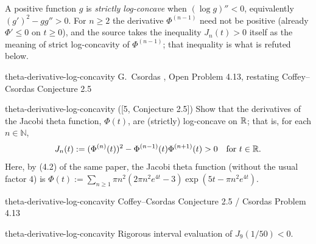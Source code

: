 \begin{cxcontext}
A positive function $g$ is \emph{strictly log-concave} when $(\log g)''<0$, equivalently $(g')^2-gg''>0$. For $n\ge2$ the derivative $\Phi^{(n-1)}$ need not be positive (already $\Phi'\le0$ on $t\ge0$), and the source takes the inequality $J_n(t)>0$ itself as the meaning of strict log-concavity of $\Phi^{(n-1)}$; that inequality is what is refuted below.
\end{cxcontext}


\begin{cxsource}{theta-derivative-log-concavity}
G.~Csordas \citeyearpar{Csordas2014}, Open Problem 4.13, restating Coffey--Csordas Conjecture 2.5
\end{cxsource}

\begin{cxstatement}{theta-derivative-log-concavity}
([5, Conjecture 2.5])  Show that the derivatives of the Jacobi theta function, $\Phi(t)$, are (strictly) log-concave on $\mathbb R$; that is, for each $n\in\mathbb N$,
\[J_n(t):=(\Phi^{(n)}(t))^2-\Phi^{(n-1)}(t)\Phi^{(n+1)}(t)>0\quad\text{for }t\in\mathbb R.\]
Here, by (4.2) of the same paper, the Jacobi theta function (without the usual factor $4$) is $\Phi(t):=\sum_{n\ge1}\pi n^2\left(2\pi n^2e^{4t}-3\right)\exp\left(5t-\pi n^2e^{4t}\right)$.
\end{cxstatement}

\begin{cxsummary}{theta-derivative-log-concavity}
Coffey--Csordas Conjecture 2.5 / Csordas Problem 4.13 \citeyearpar{Csordas2014}
\end{cxsummary}

\begin{cxcertificate}{theta-derivative-log-concavity}
Rigorous interval evaluation of $J_9(1/50)<0$.
\end{cxcertificate}

